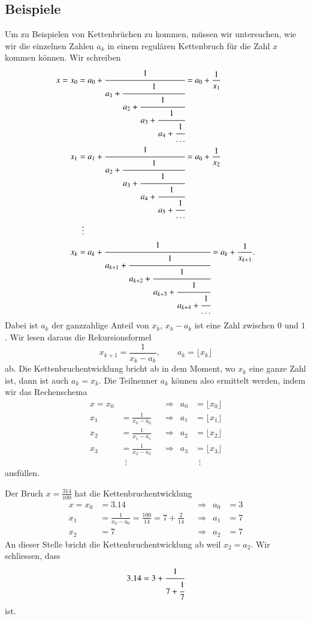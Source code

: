 %
%
%
\subsection{Beispiele \label{subsection:cf:beispiele}}
Um zu Beispielen von Kettenbrüchen zu kommen, müssen wir untersuchen,
wie wir die einzelnen Zahlen $a_k$ in einem regulären Kettenbruch
für die Zahl  $x$ kommen können.
Wir schreiben 
\begin{align*}
x=
x_0
&=
a_0+\cfrac{1}{
a_1+\cfrac{1}{
a_2+\cfrac{1}{
a_3+\cfrac{1}{
a_4+\cfrac{1}{\dots}}}}} = a_0 + \frac{1}{x_1}
\\
x_1
&=
a_1+\cfrac{1}{
a_2+\cfrac{1}{
a_3+\cfrac{1}{
a_4+\cfrac{1}{
a_5+\cfrac{1}{\dots}}}}} = a_0 + \frac{1}{x_2}
\\
&\phantom{0}\vdots
\\
x_k
&=
a_k+\cfrac{1}{
a_{k+1}+\cfrac{1}{
a_{k+2}+\cfrac{1}{
a_{k+3}+\cfrac{1}{
a_{k+4}+\cfrac{1}{\dots}}}}} = a_k + \frac{1}{x_{k+1}}.
\end{align*}
Dabei ist $a_k$ der ganzzahlige Anteil von $x_k$, $x_k - a_k$ ist
eine Zahl zwischen $0$ und $1$.
Wir lesen daraus die Rekursionsformel
\[
x_{k+1} = \frac{1}{x_k-a_k},
\qquad
a_k = \lfloor x_k\rfloor
\]
ab.
Die Kettenbruchentwicklung bricht ab in dem Moment, wo $x_k$ eine ganze Zahl
ist, dann ist auch $a_k=x_k$.
Die Teilnenner $a_k$ können also ermittelt werden, indem wir das
Rechenschema
\[
\begin{aligned}
x=x_0&                   &&\Rightarrow & a_0&=\lfloor x_0\rfloor \\
  x_1&=\frac{1}{x_0-a_0} &&\Rightarrow & a_1&=\lfloor x_1\rfloor \\
  x_2&=\frac{1}{x_1-a_1} &&\Rightarrow & a_2&=\lfloor x_2\rfloor \\
  x_3&=\frac{1}{x_2-a_2} &&\Rightarrow & a_3&=\lfloor x_3\rfloor \\
     &\phantom{1}\vdots  &&            &    &\phantom{1}\vdots
\end{aligned}
\]
ausfüllen.

\begin{beispiel}
Der Bruch $x=\frac{314}{100}$ hat die Kettenbruchentwicklung
\[
\begin{aligned}
x=x_0&=3.14                                           &&\Rightarrow& a_0 &= 3 \\
  x_1&=\frac{1}{x_0-a_0}=\frac{100}{14}=7+\frac{2}{14}&&\Rightarrow& a_1 &= 7 \\
  x_2&=7                                              &&\Rightarrow& a_2 &= 7
\end{aligned}
\]
An dieser Stelle bricht die Kettenbruchentwicklung ab weil $x_2=a_2$.
Wir schliessen, dass
\[
3.14 
=
3+\cfrac{1}{
7+\cfrac{1}{7}}
\]
ist.
\end{beispiel}

